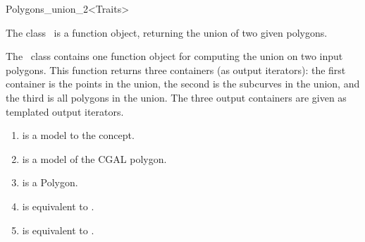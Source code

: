 
\ccRefPageBegin



\begin{ccRefFunctionObjectClass}{Polygons_union_2<Traits>}
\label{OVL_sec:polygon_union}
    
\ccDefinition
The class \ccClassTemplateName\ is a function object,
returning the union of two given polygons.


  

The \ccClassTemplateName\ class contains one function
object for computing the union on two input polygons.
This function returns three containers (as output iterators):
the first container is the points in the union, 
the second is the subcurves in the union,
and the third is all polygons in the union.
The three output containers are given as templated 
output iterators.


\begin{enumerate}
   \item
    is a model to the  concept.
   \item
    is a model of the CGAL polygon.
   \item
    is a Polygon.
   \item    
    is equivalent to .
   \item
    is equivalent to .
\end{enumerate}


\end{ccRefFunctionObjectClass}
